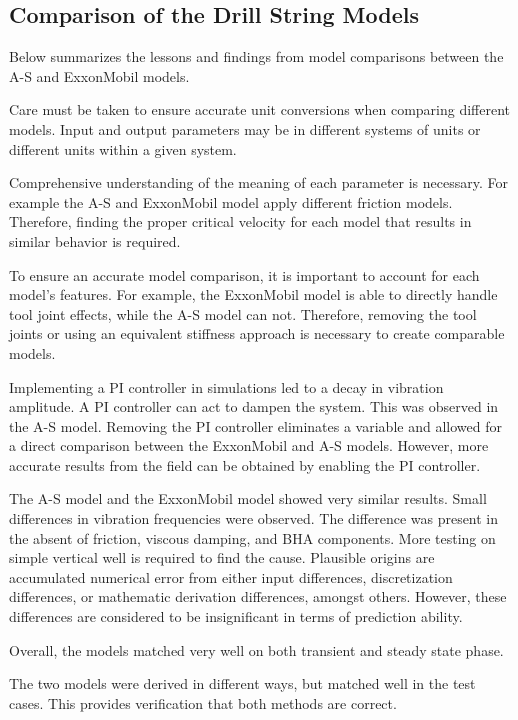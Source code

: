 \subsection{Comparison of the Drill String Models}
Below summarizes the lessons and findings from model comparisons between the A-S and ExxonMobil models.
\begin{bulletedlist}
    \item Care must be taken to ensure accurate unit conversions when comparing different models. Input and output parameters may be in different systems of units or different units within a given system.
    \item Comprehensive understanding of the meaning of each parameter is necessary. For example the A-S and ExxonMobil model apply different friction models. Therefore, finding the proper critical velocity for each model that results in similar behavior is required.
    \item To ensure an accurate model comparison, it is important to account for each model's features. For example, the ExxonMobil model is able to directly handle tool joint effects, while the A-S model can not. Therefore, removing the tool joints or using an equivalent stiffness approach is necessary to create comparable models.
    \item Implementing a PI controller in simulations led to a decay in vibration amplitude. A PI controller can act to dampen the system. This was observed in the A-S model. Removing the PI controller eliminates a variable and allowed for a direct comparison between the ExxonMobil and A-S models. However, more accurate results from the field can be obtained by enabling the PI controller.
    \item The A-S model and the ExxonMobil model showed very similar results. Small differences in vibration frequencies were observed. The difference was present in the absent of friction, viscous damping, and BHA components. More testing on simple vertical well is required to find the cause.  Plausible origins are accumulated numerical error from either input differences, discretization differences, or mathematic derivation differences, amongst others.  However, these differences are considered to be insignificant in terms of prediction ability.
    \item Overall, the models matched very well on both transient and steady state phase.
    \item The two models were derived in different ways, but matched well in the test cases.  This provides verification that both methods are correct.
\end{bulletedlist}


